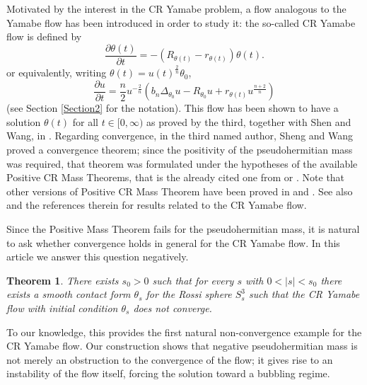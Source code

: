 \documentclass[a4paper,12pt]{amsart}
\newtheorem{teorema}[proposizione]{Theorem}
\newcommand{\de}{\partial}
\begin{document}
\vspace{5mm}

Motivated by the interest in the CR Yamabe problem, a flow analogous to the Yamabe flow has been introduced in order to study it: the so-called CR Yamabe flow is defined by
$$\frac{\de\theta(t)}{\de t} = -(R_{\theta(t)}-r_{\theta(t)})\theta(t).$$
or equivalently, writing $\theta(t)=u(t)^{\frac{2}{n}}\theta_0$,
$$\frac{\de u}{\de t} = \frac{n}{2}u^{-\frac{2}{n}}\left(b_n\Delta_{\theta_0}u-R_{\theta_0}u +r_{\theta(t)}u^{\frac{n+2}{n}} \right)$$
(see Section \ref{Section2} for the notation).
This flow has been shown to have a solution $\theta(t)$ for all $t\in[0,\infty)$ as proved by the third, together with Shen and Wang, in \cite{H-LTexistence}. Regarding convergence, in \cite{HSW} the third named author, Sheng and Wang proved a convergence theorem; since the positivity of the pseudohermitian mass was required, that theorem was formulated under the hypotheses of the available Positive CR Mass Theorems, that is the already cited one from \cite{CMY1} or \cite{CCY}. 
Note that other versions of Positive 
CR Mass Theorem have been proved in \cite{CC}
and \cite{H1}.
See also \cite{CC1,CCW,H3,H2,HW,SW}
and the references therein for results 
related to the CR Yamabe flow. 



 

 

Since the Positive Mass Theorem fails for the pseudohermitian mass,
it is natural to ask whether convergence holds in general for the CR Yamabe flow. In this article we answer this question negatively.

\begin{teorema}\label{MainTheorem}
 There exists $s_0>0$ such that for every $s$ with $0<|s|<s_0$ there exists a smooth contact form $\theta_s$ for the Rossi sphere $S^3_s$ such that the CR Yamabe flow with initial condition $\theta_s$ does not converge.
\end{teorema}
To our knowledge, this provides the first natural non-convergence
example for the CR Yamabe flow. Our construction shows that negative
pseudohermitian mass is not merely an obstruction to the convergence of the flow; it gives rise to an instability of the flow
itself, forcing the solution toward a bubbling regime.
\end{document}
